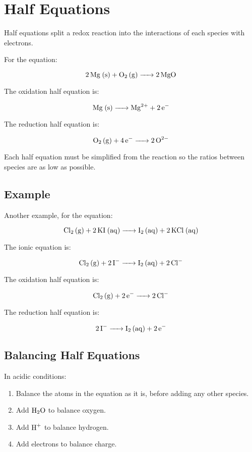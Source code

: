 \documentclass[a4paper,11pt]{article}
\begin{document}
\section{Half Equations}

Half equations split a redox reaction into the interactions of each species
with electrons.

For the equation:

$$
\ce{2Mg (s) + O2 (g) -> 2MgO}
$$

The oxidation half equation is:

$$
\ce{Mg (s) -> Mg^{2+} + 2e^{-}}
$$

The reduction half equation is:

$$
\ce{O2 (g) + 4e^{-} -> 2O^{2-}}
$$

Each half equation must be simplified from the reaction so the ratios between
species are as low as possible.

\subsection{Example}

Another example, for the equation:

$$
\ce{Cl2 (g) + 2KI (aq) -> I2 (aq) + 2KCl (aq)}
$$

The ionic equation is:

$$
\ce{Cl2 (g) + 2I^{-} -> I2 (aq) + 2Cl^{-}}
$$

The oxidation half equation is:

$$
\ce{Cl2 (g) + 2e^{-} -> 2Cl^{-}}
$$

The reduction half equation is:

$$
\ce{2I^{-} -> I2 (aq) + 2e^{-}}
$$

\subsection{Balancing Half Equations}

In acidic conditions:

\begin{enumerate}
\item Balance the atoms in the equation as it is, before adding any other
	species.
\item Add $\ce{H2O}$ to balance oxygen.
\item Add $\ce{H+}$ to balance hydrogen.
\item Add electrons to balance charge.
\end{enumerate}
\end{document}
